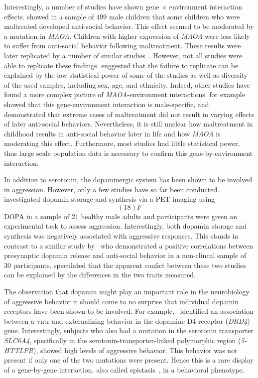 Interestingly, a number of studies have shown gene $\times$ environment interaction effects.
\citet{Caspi2002} showed in a sample of $499$ male children that some children who were maltreated developed anti-social behavior.
This effect seemed to be moderated by a mutation in \textit{MAOA}.
Children with higher expression of \textit{MAOA} were less likely to suffer from anti-social behavior following maltreatment.
These results were later replicated by a number of similar studies~\cite{KimCohen2006}.
However, not all studies were able to replicate these findings.
\citet{Anholt2012} suggested that the failure to replicate can be explained by the low statistical power of some of the studies as well as diversity of the used samples, including sex, age, and ethnicity.
Indeed, other studies have found a more complex picture of \textit{MAOA}-environment interactions.
\citet{Huang2004} for example showed that this gene-environment interaction is male-specific, and~\citet{Weder2009} demonstrated that extreme cases of maltreatment did not result in varying effects of later anti-social behaviors.
Nevertheless, it is still unclear how maltreatment in childhood results in anti-social behavior later in life and how \textit{MAOA} is moderating this effect.
Furthermore, most studies had little statistical power,
thus large scale population data is necessary to confirm this gene-by-environment interaction.

In addition to serotonin, the dopaminergic system has been shown to be involved in aggression.
However, only a few studies have so far been conducted.
\citet{Schluter2013} investigated dopamin storage and synthesis via a PET imaging using \[(18)F\]DOPA in a sample of 21 healthy male adults and participants were given an experimental task to assess aggression.
Interestingly, both dopamin storage and synthesis was negatively associated with aggressive responses.
This stands in contrast to a similar study by~\citet{Buckholtz2010} who demonstrated a positive correlations between presynaptic dopamin release and anti-social behavior in a non-clincal sample of 30 participants. 
\citet{Rosell2015} speculated that the apparent confict between these two studies can be explained by the differences in the two traits measured.

The observation that dopamin might play an important role in the neurobiology of aggressive behavior it should come to no surprise that individual dopamin receptors have been shown to be involved.
For example,~\citet{Hohmann2009} identified an association between a \acrfull{vntr} and externalizing behavior in the dopamine D4 receptor (\textit{DRD4}) gene.
Interestingly, subjects who also had a mutation in the serotonin transporter \textit{SLC6A4}, specifically in the serotonin-transporter-linked polymorphic region (\textit{5-HTTLPR}), showed high levels of aggressive behavior.
This behavior was not present if only one of the two mutations were present.
Hence this is a rare display of a gene-by-gene interaction, also called epistasis~\cite{Anholt2012}, in a behavioral phenotype.

